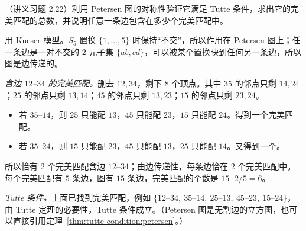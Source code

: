 \begin{workedexample}\label{we:tutte-condition:petersen-graph}
（讲义习题 2.22）利用 Petersen 图的对称性验证它满足 Tutte 条件，求出它的完美匹配的总数，并说明任意一条边包含在多少个完美匹配中。
\end{workedexample}
\begin{solution}
用 Kneser 模型。$S_5$ 置换 $\{1,\dots,5\}$ 时保持“不交”，所以作用在 Petersen 图上；任一条边是一对不交的 $2$-元子集 $\{ab,cd\}$，可以被某个置换映到任何另一条边，所以图是边传递的。

\emph{含边 $12$--$34$ 的完美匹配。}删去 $12,34$，剩下 $8$ 个顶点。其中 $35$ 的邻点只剩 $14,24$；$25$ 的邻点只剩 $13,14$；$45$ 的邻点只剩 $13,23$；$15$ 的邻点只剩 $23,24$。
\begin{itemize}
\item 若 $35$--$14$，则 $25$ 只能配 $13$，$45$ 只能配 $23$，$15$ 只能配 $24$。得到一个完美匹配。
\item 若 $35$--$24$，则 $15$ 只能配 $23$，$45$ 只能配 $13$，$25$ 只能配 $14$。又得到一个。
\end{itemize}
所以恰有 $2$ 个完美匹配含边 $12$--$34$；由边传递性，每条边恰在 $2$ 个完美匹配中。每个完美匹配有 $5$ 条边，图有 $15$ 条边，完美匹配的个数是 $15\cdot2/5=6$。

\emph{Tutte 条件。}上面已找到完美匹配，例如 $\{12\text{--}34,\ 35\text{--}14,\ 25\text{--}13,\ 45\text{--}23,\ 15\text{--}24\}$，由 Tutte 定理的必要性，Tutte 条件成立。（Petersen 图是无割边的立方图，也可以直接引用定理~\ref{thm:tutte-condition:petersen}。）
\end{solution}

